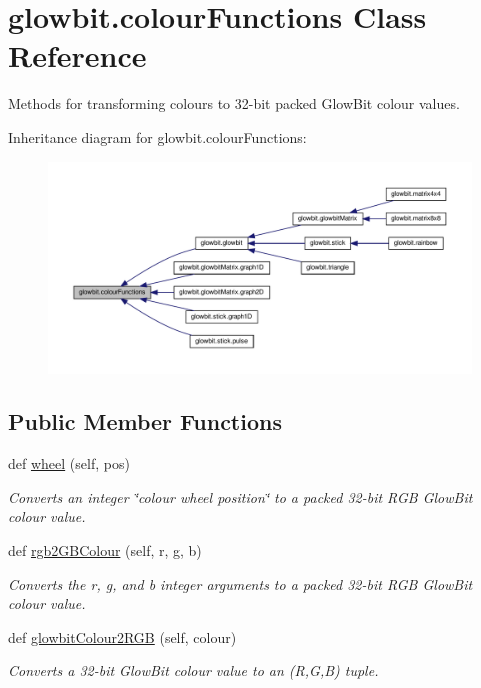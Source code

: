 \hypertarget{classglowbit_1_1colourFunctions}{}\section{glowbit.\+colour\+Functions Class Reference}
\label{classglowbit_1_1colourFunctions}


Methods for transforming colours to 32-\/bit packed Glow\+Bit colour values.  




Inheritance diagram for glowbit.\+colour\+Functions\+:\nopagebreak
\begin{figure}[H]
\begin{center}
\leavevmode
\includegraphics[width=350pt]{classglowbit_1_1colourFunctions__inherit__graph}
\end{center}
\end{figure}
\subsection*{Public Member Functions}
\begin{DoxyCompactItemize}
\item 
def \hyperlink{classglowbit_1_1colourFunctions_afb989958ec7aa4dfb7a04f359da5969a}{wheel} (self, pos)
\begin{DoxyCompactList}\small\item\em Converts an integer \char`\"{}colour wheel position\char`\"{} to a packed 32-\/bit R\+GB Glow\+Bit colour value. \end{DoxyCompactList}\item 
def \hyperlink{classglowbit_1_1colourFunctions_a1c24f694a16f3c721a0e7771740ebc56}{rgb2\+G\+B\+Colour} (self, r, g, b)
\begin{DoxyCompactList}\small\item\em Converts the r, g, and b integer arguments to a packed 32-\/bit R\+GB Glow\+Bit colour value. \end{DoxyCompactList}\item 
def \hyperlink{classglowbit_1_1colourFunctions_a6f887561ea3261440350ac3b1df4a259}{glowbit\+Colour2\+R\+GB} (self, colour)
\begin{DoxyCompactList}\small\item\em Converts a 32-\/bit Glow\+Bit colour value to an (R,G,B) tuple. \end{DoxyCompactList}\end{DoxyCompactItemize}


